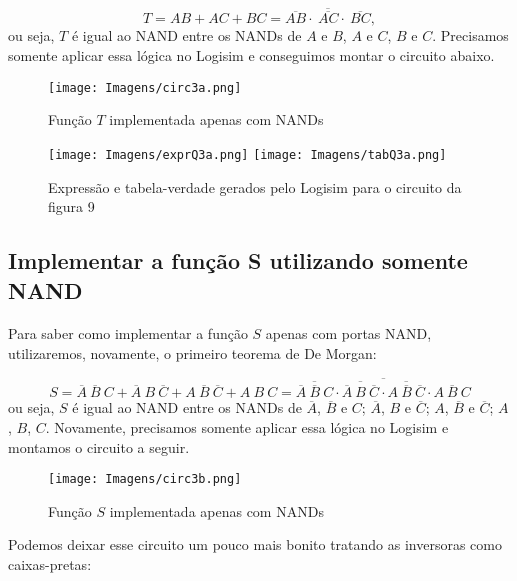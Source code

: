 \documentclass[a4paper, 12pt]{article}
\begin{document}
\[
T = AB + AC + BC = \overline{\overline{AB} \cdot \ \overline{AC} \cdot \ \overline{BC}},
\]
ou seja, $T$ é igual ao NAND entre os NANDs de $A$ e $B$, $A$ e $C$, $B$ e $C$. Precisamos somente aplicar essa lógica no Logisim e conseguimos montar o circuito abaixo.

\begin{figure}[H]
    \centering
    \texttt{[image: Imagens/circ3a.png]}
    \caption{Função $T$ implementada apenas com NANDs}
\end{figure}

\begin{figure}[H]
    \centering
    \texttt{[image: Imagens/exprQ3a.png]}
    \texttt{[image: Imagens/tabQ3a.png]} \\
    \caption{Expressão e tabela-verdade gerados pelo Logisim para o circuito da figura 9}
\end{figure}

\subsection{Implementar a função S utilizando somente NAND}
\paragraph{}
Para saber como implementar a função $S$ apenas com portas NAND, utilizaremos, novamente, o primeiro teorema de De Morgan:

\[
S = \overline{A} \ \overline{B} \ C + \overline{A} \ B \ \overline{C} + A \ \overline{B} \ \overline{C} + A \ B \ C = \overline{\overline{\overline{A} \ \overline{B} \ C} \cdot \overline{\overline{A} \ B \ \overline{C}} \cdot \overline{A \ \overline{B} \ \overline{C}} \cdot \overline{A \ B \ C}}
\]
ou seja, $S$ é igual ao NAND entre os NANDs de $\overline{A}$, $\overline{B}$ e $C$; $\overline{A}$, $B$ e $\overline{C}$; $A$, $\overline{B}$ e $\overline{C}$; $A$, $B$, $C$. Novamente, precisamos somente aplicar essa lógica no Logisim e montamos o circuito a seguir.

\begin{figure}[H]
    \centering
    \texttt{[image: Imagens/circ3b.png]}
    \caption{Função $S$ implementada apenas com NANDs}
\end{figure}

Podemos deixar esse circuito um pouco mais bonito tratando as inversoras como caixas-pretas:
\end{document}

